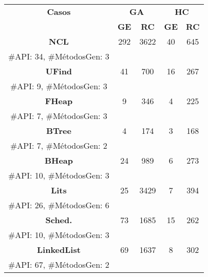 \setlength{\tabcolsep}{4pt} 

\begin{table}[H]
\centering
\begin{tabular}{cccccc}
\hline
\multicolumn{2}{c}{\textbf{Casos}} & \multicolumn{2}{c}{\textbf{GA}} & \multicolumn{2}{c}{\textbf{HC}} \\
\cline{3-6}
\multicolumn{2}{c}{} & \textbf{\tiny GE} & \textbf{\tiny RC} & \textbf{\tiny GE} & \textbf{\tiny RC} \\
\hline
\multicolumn{2}{c}{\textbf{NCL}}            & 292   & 3622 & 40   & 645  \\
\multicolumn{2}{c}{\tiny \#API: 34, \#MétodosGen: 3} & & & & \\

\multicolumn{2}{c}{\textbf{UFind}}          & 41     & 700    & 16  & 267  \\
\multicolumn{2}{c}{\tiny \#API: 9, \#MétodosGen: 3}  & & & & \\

\multicolumn{2}{c}{\textbf{FHeap}}          & 9      & 346   & 4     & 225  \\
\multicolumn{2}{c}{\tiny \#API: 7, \#MétodosGen: 3}  & & & & \\

\multicolumn{2}{c}{\textbf{BTree}}          & 4       & 174   & 3    & 168  \\
\multicolumn{2}{c}{\tiny \#API: 7, \#MétodosGen: 2}  & & & & \\

\multicolumn{2}{c}{\textbf{BHeap}}          & 24    & 989  & 6    & 273  \\
\multicolumn{2}{c}{\tiny \#API: 10, \#MétodosGen: 3} & & & & \\

\multicolumn{2}{c}{\textbf{Lits}}           & 25   & 3429 & 7    & 394  \\
\multicolumn{2}{c}{\tiny \#API: 26, \#MétodosGen: 6} & & & & \\

\multicolumn{2}{c}{\textbf{Sched.}}         & 73     & 1685 & 15   & 262  \\
\multicolumn{2}{c}{\tiny \#API: 10, \#MétodosGen: 3} & & & & \\

\multicolumn{2}{c}{\textbf{LinkedList}}     & 69     & 1637 & 8    & 302 \\
\multicolumn{2}{c}{\tiny \#API: 67, \#MétodosGen: 2} & & & & \\


\end{tabular}
\end{table}
